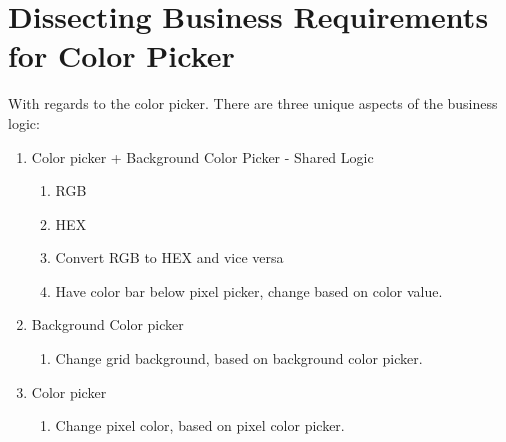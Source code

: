 \section{ Dissecting Business Requirements for Color Picker }
With regards to the color picker. There are three unique aspects of the business
logic:
\begin{enumerate}
  \item Color picker + Background Color Picker - Shared Logic
    \begin{enumerate}
      \item RGB
      \item HEX
      \item Convert RGB to HEX and vice versa
      \item Have color bar below pixel picker, change based on color value.
    \end{enumerate}
  \item Background Color picker
    \begin{enumerate}
      \item Change grid background, based on background color picker.
    \end{enumerate}
  \item Color picker
    \begin{enumerate}
      \item Change pixel color, based on pixel color picker.
    \end{enumerate}
\end{enumerate}
